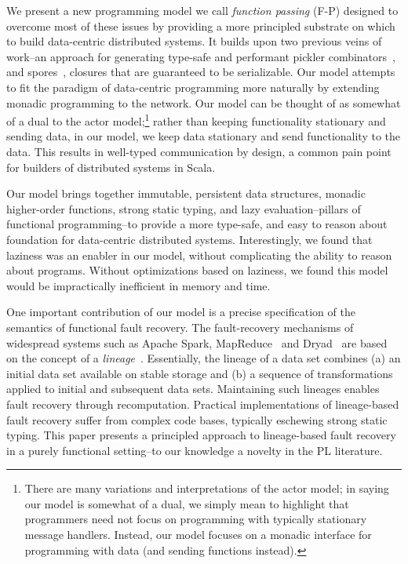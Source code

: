 \documentclass[preprint]{sigplanconf}
\theoremstyle{definition}
\theoremstyle{definition}
\begin{document}
We present a new programming model we call {\em function passing} (F-P)
designed to overcome most of these issues by providing a more principled
substrate on which to build data-centric distributed systems. It builds upon
two previous veins of work--an approach for generating type-safe and
performant pickler combinators~\cite{Pickling}, and spores~\cite{Spores},
closures that are guaranteed to be serializable.  Our model attempts to fit
the paradigm of data-centric programming more naturally by extending monadic
programming to the network. Our model can be thought of as somewhat of a dual
to the actor model;\footnote{There are many variations and interpretations of
the actor model; in saying our model is somewhat of a dual, we simply mean to
highlight that programmers need not focus on programming with typically
stationary message handlers. Instead, our model focuses on a monadic interface
for programming with data (and sending functions instead).} rather than
keeping functionality stationary and sending data, in our model, we keep data
stationary and send functionality to the data. This results in well-typed
communication by design, a common pain point for builders of distributed
systems in Scala.

Our model brings together immutable, persistent data structures, monadic
higher-order functions, strong static typing, and lazy evaluation--pillars of
functional programming--to provide a more type-safe, and easy to reason about
foundation for data-centric distributed systems. Interestingly, we found that
laziness was an enabler in our model, without complicating the ability to
reason about programs. Without optimizations based on laziness, we found this
model would be impractically inefficient in memory and time.

One important contribution of our model is a precise specification of the
semantics of functional fault recovery. The fault-recovery mechanisms of
widespread systems such as Apache Spark, MapReduce~\cite{MapReduce} and
Dryad~\cite{Dryad} are based on the concept of a
\emph{lineage}~\cite{Lineage1, Lineage2}. Essentially, the lineage of a data set
combines (a) an initial data set available on stable storage and (b) a
sequence of transformations applied to initial and subsequent data sets.
Maintaining such lineages enables fault recovery through recomputation.
Practical implementations of lineage-based fault recovery suffer from complex
code bases, typically eschewing strong static typing. This paper presents a
principled approach to lineage-based fault recovery in a purely functional
setting--to our knowledge a novelty in the PL literature.
\end{document}
